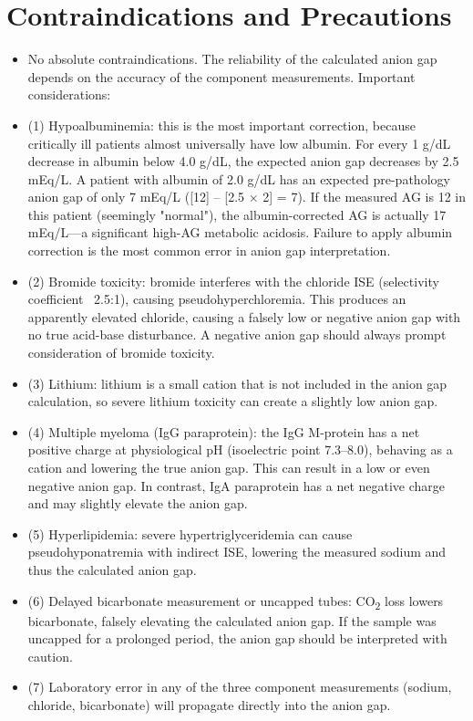 \section*{Contraindications and Precautions}
\begin{itemize}
  \item No absolute contraindications. The reliability of the calculated anion gap depends on the accuracy of the component measurements. Important considerations:
  \item (1) Hypoalbuminemia: this is the most important correction, because critically ill patients almost universally have low albumin. For every 1 g/dL decrease in albumin below 4.0 g/dL, the expected anion gap decreases by 2.5 mEq/L. A patient with albumin of 2.0 g/dL has an expected pre-pathology anion gap of only 7 mEq/L ([12] -- [2.5 $\times$ 2] = 7). If the measured AG is 12 in this patient (seemingly "normal"), the albumin-corrected AG is actually 17 mEq/L---a significant high-AG metabolic acidosis. Failure to apply albumin correction is the most common error in anion gap interpretation.
  \item (2) Bromide toxicity: bromide interferes with the chloride ISE (selectivity coefficient ~2.5:1), causing pseudohyperchloremia. This produces an apparently elevated chloride, causing a falsely low or negative anion gap with no true acid-base disturbance. A negative anion gap should always prompt consideration of bromide toxicity.
  \item (3) Lithium: lithium is a small cation that is not included in the anion gap calculation, so severe lithium toxicity can create a slightly low anion gap.
  \item (4) Multiple myeloma (IgG paraprotein): the IgG M-protein has a net positive charge at physiological pH (isoelectric point 7.3--8.0), behaving as a cation and lowering the true anion gap. This can result in a low or even negative anion gap. In contrast, IgA paraprotein has a net negative charge and may slightly elevate the anion gap.
  \item (5) Hyperlipidemia: severe hypertriglyceridemia can cause pseudohyponatremia with indirect ISE, lowering the measured sodium and thus the calculated anion gap.
  \item (6) Delayed bicarbonate measurement or uncapped tubes: CO\textsubscript{2} loss lowers bicarbonate, falsely elevating the calculated anion gap. If the sample was uncapped for a prolonged period, the anion gap should be interpreted with caution.
  \item (7) Laboratory error in any of the three component measurements (sodium, chloride, bicarbonate) will propagate directly into the anion gap.
\end{itemize}
